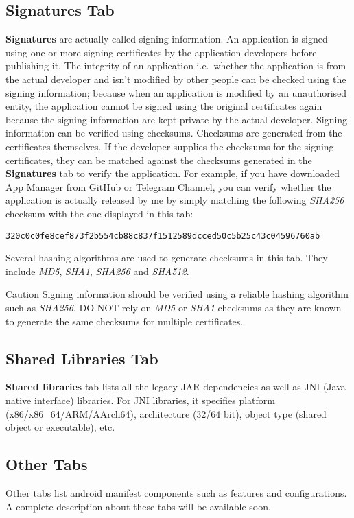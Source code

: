 \subsection{Signatures Tab}\label{subsec:signatures-tab} %
\textbf{Signatures} are actually called signing information. An application is signed using one or more signing
certificates by the application developers before publishing it. The integrity of an application i.e.\ whether the
application is from the actual developer and isn't modified by other people can be checked using the signing information;
because when an application is modified by an unauthorised entity, the application cannot be signed using the original
certificates again because the signing information are kept private by the actual developer. Signing information can be
verified using checksums. Checksums are generated from the certificates themselves. If the developer supplies the
checksums for the signing certificates, they can be matched against the checksums generated in the \textbf{Signatures}
tab to verify the application. For example, if you have downloaded App Manager from GitHub or Telegram Channel, you can
verify whether the application is actually released by me by simply matching the following \textit{SHA256} checksum with
the one displayed in this tab:
\begin{Verbatim}
320c0c0fe8cef873f2b554cb88c837f1512589dcced50c5b25c43c04596760ab
\end{Verbatim}

Several hashing algorithms are used to generate checksums in this tab. They include \textit{MD5}, \textit{SHA1},
\textit{SHA256} and \textit{SHA512}.

\begin{danger}{Caution}
    Signing information should be verified using a reliable hashing algorithm such as \textit{SHA256}. DO NOT rely on
    \textit{MD5} or \textit{SHA1} checksums as they are known to generate the same checksums for multiple certificates.
\end{danger}

\subsection{Shared Libraries Tab}\label{subsec:shared-libs-tab} %
\textbf{Shared libraries} tab lists all the legacy JAR dependencies as well as JNI (Java native interface) libraries.
For JNI libraries, it specifies platform (x86/x86\_64/ARM/AArch64), architecture (32/64 bit), object type (shared object
or executable), etc.

\subsection{Other Tabs}\label{subsec:other-tabs} %
Other tabs list android manifest components such as features and configurations. A complete description
about these tabs will be available soon.
